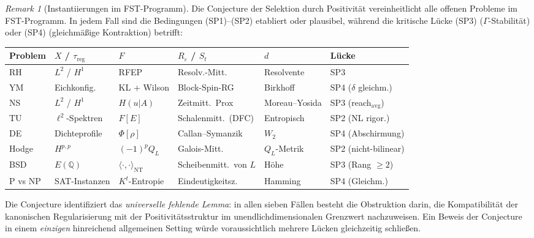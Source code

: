 \documentclass[12pt,a4paper]{article}
\theoremstyle{definition}
\theoremstyle{remark}
\newtheorem{remark}[theorem]{Remark}
\begin{document}
\begin{remark}[Instantiierungen im FST-Programm]
\label{rem:selection-instantiations}
Die Conjecture der Selektion durch Positivit\"at vereinheitlicht alle offenen Probleme im FST-Programm. In jedem Fall sind die Bedingungen \textup{(SP1)--(SP2)} etabliert oder plausibel, w\"ahrend die kritische L\"ucke \textup{(SP3)} ($\Gamma$-Stabilit\"at) oder \textup{(SP4)} (gleichm\"a\ss ige Kontraktion) betrifft:

\begin{center}
\small
\begin{tabular}{l|l|l|l|l|l}
\textbf{Problem} & $X$ / $\tau_{\mathrm{reg}}$ & $F$ & $R_\varepsilon$ / $S_t$ & $d$ & \textbf{L\"ucke} \\
\hline
RH & $L^2$ / $H^1$ & RFEP & Resolv.-Mitt. & Resolvente & SP3 \\
YM & Eichkonfig. & KL + Wilson & Block-Spin-RG & Birkhoff & SP4 ($\delta$ gleichm.) \\
NS & $L^2$ / $H^1$ & $H(u|A)$ & Zeitmitt.\ Prox & Moreau--Yosida & SP3 (reach$_{\mathrm{avg}}$) \\
TU & $\ell^2$-Spektren & $F[E]$ & Schalenmitt.\ (DFC) & Entropisch & SP2 (NL rigor.) \\
DE & Dichteprofile & $\Phi[\rho]$ & Callan--Symanzik & $W_2$ & SP4 (Abschirmung) \\
Hodge & $H^{p,p}$ & $(-1)^p Q_L$ & Galois-Mitt. & $Q_L$-Metrik & SP2 (nicht-bilinear) \\
BSD & $E(\mathbb{Q})$ & $\langle\cdot,\cdot\rangle_{\mathrm{NT}}$ & Scheibenmitt.\ von $L$ & H\"ohe & SP3 (Rang $\geq 2$) \\
P vs NP & SAT-Instanzen & $K^t$-Entropie & Eindeutigkeitsz. & Hamming & SP4 (Gleichm.) \\
\end{tabular}
\end{center}

\noindent
Die Conjecture identifiziert das \emph{universelle fehlende Lemma}: in allen sieben F\"allen besteht die Obstruktion darin, die Kompatibilit\"at der kanonischen Regularisierung mit der Positivit\"atsstruktur im unendlichdimensionalen Grenzwert nachzuweisen. Ein Beweis der Conjecture in einem \emph{einzigen} hinreichend allgemeinen Setting w\"urde voraussichtlich mehrere L\"ucken gleichzeitig schlie\ss en.
\end{remark}
\end{document}
